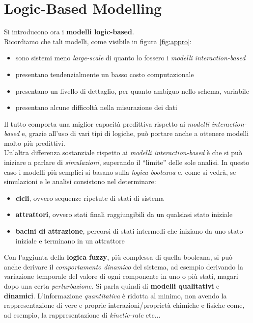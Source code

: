 \documentclass[a4paper,12pt, oneside]{book}
\begin{document}
\chapter{Logic-Based Modelling}
Si introducono ora i \textbf{modelli logic-based}.\\
Ricordiamo che tali modelli, come visibile in figura \ref{fig:appro}:
\begin{itemize}
  \item sono sistemi meno \textit{large-scale} di quanto lo fossero i
  \textit{modelli interaction-based}
  \item presentano tendenzialmente un basso costo computazionale
  \item presentano un livello di dettaglio, per quanto ambiguo nello schema,
  variabile
  \item presentano alcune difficoltà nella misurazione dei dati
\end{itemize}
Il tutto comporta una miglior capacità predittiva rispetto ai \textit{modelli
  interaction-based} e, grazie all'uso di vari tipi di logiche, può portare
anche a ottenere modelli molto più predittivi.\\
Un'altra differenza sostanziale rispetto ai \textit{modelli interaction-based} è
che si può iniziare a parlare di \textit{simulazioni}, superando il ``limite''
delle sole analisi. In questo caso i modelli più semplici si basano sulla
\textit{logica booleana} e, come si vedrà, se simulazioni e le analisi
consistono nel determinare:
\begin{itemize}
  \item \textbf{cicli}, ovvero sequenze ripetute di stati di sistema
  \item \textbf{attrattori}, ovvero stati finali raggiungibili da un qualsiasi
  stato iniziale
  \item \textbf{bacini di attrazione}, percorsi di stati intermedi che iniziano
  da uno stato iniziale e terminano in un attrattore
\end{itemize}
Con l'aggiunta della \textbf{logica fuzzy}, più complessa di quella booleana, si
può anche derivare il \textit{comportamento dinamico} del sistema, ad esempio
derivando la variazione temporale del valore di ogni componente in uno o più
stati, magari dopo una certa \textit{perturbazione}. Si parla quindi di
\textbf{modelli qualitativi} e 
\textbf{dinamici}. L'informazione \textit{quantitativa} è ridotta al minimo, non
avendo la rappresentazione di vere e proprie interazioni/proprietà chimiche e
fisiche 
come, ad esempio, la rappresentazione di \textit{kinetic-rate} etc$\ldots$\\ 
\end{document}
